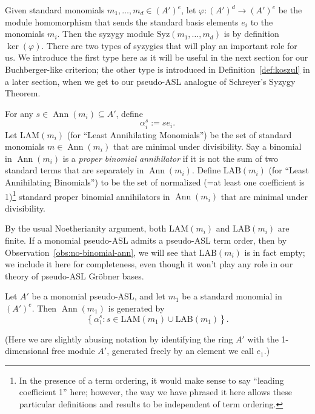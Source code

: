\documentclass[11pt,reqno]{amsart}
\DeclareMathOperator{\Ann}{Ann}
\newcommand{\Syz}{\text{Syz}}
\newcommand{\LAM}{\ensuremath{\text{LAM}}}
\newcommand{\LAB}{\ensuremath{\text{LAB}}}
\theoremstyle{definition}
\numberwithin{equation}{section}
\begin{document}
Given standard monomials $m_1, \dotsc, m_d \in (A')^e$, let $\varphi \colon (A')^d \to (A')^e$ be the module homomorphism that sends the standard basis elements $e_i$ to the monomials $m_i$. Then the syzygy module $\Syz(m_1, \dotsc, m_d)$ is by definition $\ker(\varphi)$. 
There are two types of syzygies that will play an important role for us. We introduce the first type here as it will be useful in the next section for our Buchberger-like criterion; the other type is introduced in Definition~\ref{def:koszul} in a later section, when we get to our pseudo-ASL analogue of Schreyer's Syzygy Theorem. 

\begin{definition} \label{def:annsyz}
For any $s \in \Ann(m_i) \subseteq A'$, define 
\[
\alpha_i^s := s e_i.
\]
Let $\LAM(m_i)$ (for ``Least Annihilating Monomials'') be the set of standard monomials $m \in \Ann(m_i)$ that are minimal under divisibility. Say a binomial in $\Ann(m_i)$ is a \emph{proper binomial annihilator} if it is not the sum of two standard terms that are separately in $\Ann(m_i)$. Define $\LAB(m_i)$ (for ``Least Annihilating Binomials'') to be the set of normalized (=at least one coefficient is 1)\footnote{In the presence of a term ordering, it would make sense to say ``leading coefficient 1'' here; however, the way we have phrased it here allows these particular definitions and results to be independent of term ordering.} standard proper binomial annihilators in $\Ann(m_i)$ that are minimal under divisibility. 
\end{definition}

By the usual Noetherianity argument, both $\LAM(m_i)$ and $\LAB(m_i)$ are finite. If a monomial pseudo-ASL admits a pseudo-ASL term order, then by Observation~\ref{obs:no-binomial-ann}, we will see that $\LAB(m_i)$ is in fact empty; we include it here for completeness, even though it won't play any role in our theory of pseudo-ASL Gröbner bases.

\begin{lemma} \label{lem:monomial_ann}
Let $A'$ be a monomial pseudo-ASL, and let $m_1$ be a standard monomial in $(A')^e$. Then $\Ann(m_1)$
 is generated by 
\[
\left\{ \alpha_1^s : s \in \LAM(m_1) \cup \LAB(m_1) \right\}.
\]
\end{lemma}

(Here we are slightly abusing notation by identifying the ring $A'$ with the 1-dimensional free module $A'$, generated freely by an element we call $e_1$.)
\end{document}
